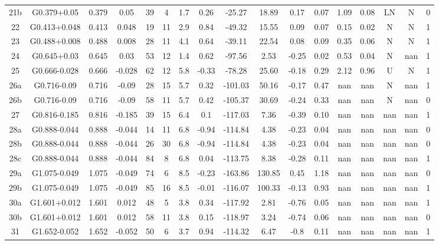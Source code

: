 \begin{table}
\begin{tabular}{ccccccccccccccccc}
21b & G0.379+0.05 & 0.379 & 0.05 & 39 & 4 & 1.7 & 0.26 & -25.27 & 18.89 & 0.17 & 0.07 & 1.09 & 0.08 & LN & N & 0 \\
22 & G0.413+0.048 & 0.413 & 0.048 & 19 & 11 & 2.9 & 0.84 & -49.32 & 15.55 & 0.09 & 0.07 & 0.15 & 0.02 & N & N & 1 \\
23 & G0.488+0.008 & 0.488 & 0.008 & 28 & 11 & 4.1 & 0.64 & -39.11 & 22.54 & 0.08 & 0.09 & 0.35 & 0.06 & N & N & 1 \\
24 & G0.645+0.03 & 0.645 & 0.03 & 53 & 12 & 1.4 & 0.62 & -97.56 & 2.53 & -0.25 & 0.02 & 0.53 & 0.04 & N & nan & 1 \\
25 & G0.666-0.028 & 0.666 & -0.028 & 62 & 12 & 5.8 & -0.33 & -78.28 & 25.60 & -0.18 & 0.29 & 2.12 & 0.96 & U & N & 1 \\
26a & G0.716-0.09 & 0.716 & -0.09 & 28 & 15 & 5.7 & 0.32 & -101.03 & 50.16 & -0.17 & 0.47 & nan & nan & N & nan & 1 \\
26b & G0.716-0.09 & 0.716 & -0.09 & 58 & 11 & 5.7 & 0.42 & -105.37 & 30.69 & -0.24 & 0.33 & nan & nan & N & nan & 0 \\
27 & G0.816-0.185 & 0.816 & -0.185 & 39 & 15 & 6.4 & 0.1 & -117.03 & 7.36 & -0.39 & 0.10 & nan & nan & nan & nan & 1 \\
28a & G0.888-0.044 & 0.888 & -0.044 & 14 & 11 & 6.8 & -0.94 & -114.84 & 4.38 & -0.23 & 0.04 & nan & nan & nan & nan & 0 \\
28b & G0.888-0.044 & 0.888 & -0.044 & 26 & 30 & 6.8 & -0.94 & -114.84 & 4.38 & -0.23 & 0.04 & nan & nan & nan & nan & 0 \\
28c & G0.888-0.044 & 0.888 & -0.044 & 84 & 8 & 6.8 & 0.04 & -113.75 & 8.38 & -0.28 & 0.11 & nan & nan & nan & nan & 1 \\
29a & G1.075-0.049 & 1.075 & -0.049 & 74 & 6 & 8.5 & -0.23 & -163.86 & 130.85 & 0.45 & 1.18 & nan & nan & nan & nan & 0 \\
29b & G1.075-0.049 & 1.075 & -0.049 & 85 & 16 & 8.5 & -0.01 & -116.07 & 100.33 & -0.13 & 0.93 & nan & nan & nan & nan & 1 \\
30a & G1.601+0.012 & 1.601 & 0.012 & 48 & 5 & 3.8 & 0.34 & -117.92 & 2.81 & -0.76 & 0.05 & nan & nan & nan & nan & 1 \\
30b & G1.601+0.012 & 1.601 & 0.012 & 58 & 11 & 3.8 & 0.15 & -118.97 & 3.24 & -0.74 & 0.06 & nan & nan & nan & nan & 0 \\
31 & G1.652-0.052 & 1.652 & -0.052 & 50 & 6 & 3.7 & 0.94 & -114.32 & 6.47 & -0.8 & 0.11 & nan & nan & nan & nan & 1 \\
\end{tabular}
\end{table}
